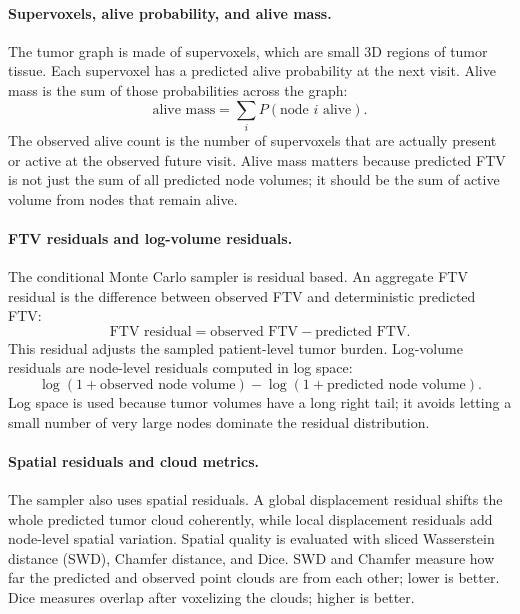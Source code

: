 \documentclass[11pt]{article}
\begin{document}
\paragraph{Supervoxels, alive probability, and alive mass.}
The tumor graph is made of supervoxels, which are small 3D regions of tumor
tissue. Each supervoxel has a predicted alive probability at the next visit.
Alive mass is the sum of those probabilities across the graph:
\[
\text{alive mass} = \sum_i P(\text{node } i \text{ alive}).
\]
The observed alive count is the number of supervoxels that are actually present
or active at the observed future visit. Alive mass matters because predicted
FTV is not just the sum of all predicted node volumes; it should be the sum of
active volume from nodes that remain alive.

\paragraph{FTV residuals and log-volume residuals.}
The conditional Monte Carlo sampler is residual based. An aggregate FTV
residual is the difference between observed FTV and deterministic predicted
FTV:
\[
\text{FTV residual} = \text{observed FTV} - \text{predicted FTV}.
\]
This residual adjusts the sampled patient-level tumor burden. Log-volume
residuals are node-level residuals computed in log space:
\[
\log(1 + \text{observed node volume}) -
\log(1 + \text{predicted node volume}).
\]
Log space is used because tumor volumes have a long right tail; it avoids
letting a small number of very large nodes dominate the residual distribution.

\paragraph{Spatial residuals and cloud metrics.}
The sampler also uses spatial residuals. A global displacement residual shifts
the whole predicted tumor cloud coherently, while local displacement residuals
add node-level spatial variation. Spatial quality is evaluated with sliced
Wasserstein distance (SWD), Chamfer distance, and Dice. SWD and Chamfer measure
how far the predicted and observed point clouds are from each other; lower is
better. Dice measures overlap after voxelizing the clouds; higher is better.
\end{document}
